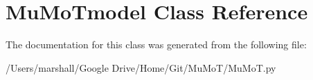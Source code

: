\hypertarget{class_mu_mo_t_1_1_mu_mo_tmodel}{}\section{Mu\+Mo\+Tmodel Class Reference}
\label{class_mu_mo_t_1_1_mu_mo_tmodel}


The documentation for this class was generated from the following file\+:\begin{DoxyCompactItemize}
\item 
/\+Users/marshall/\+Google Drive/\+Home/\+Git/\+Mu\+Mo\+T/Mu\+Mo\+T.\+py\end{DoxyCompactItemize}
